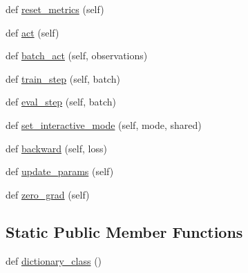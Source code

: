 \begin{DoxyCompactItemize}
def \hyperlink{classparlai_1_1core_1_1torch__agent_1_1TorchAgent_a03e18955cfd44dd019d0847bc7a46893}{reset\+\_\+metrics} (self)
\item 
def \hyperlink{classparlai_1_1core_1_1torch__agent_1_1TorchAgent_a51174dfa508970e3392246b02d0d94b5}{act} (self)
\item 
def \hyperlink{classparlai_1_1core_1_1torch__agent_1_1TorchAgent_a7754a74d6c87590f46e71ec486c285a8}{batch\+\_\+act} (self, observations)
\item 
def \hyperlink{classparlai_1_1core_1_1torch__agent_1_1TorchAgent_a8ba9d535736c0af100d00c5e7b02b61b}{train\+\_\+step} (self, batch)
\item 
def \hyperlink{classparlai_1_1core_1_1torch__agent_1_1TorchAgent_a18de0a52aeec4ef721aedbdd6ac06cad}{eval\+\_\+step} (self, batch)
\item 
def \hyperlink{classparlai_1_1core_1_1torch__agent_1_1TorchAgent_a6a7aff29231816a0f3cade9c72409dfc}{set\+\_\+interactive\+\_\+mode} (self, mode, shared)
\item 
def \hyperlink{classparlai_1_1core_1_1torch__agent_1_1TorchAgent_a8df662b1258ec67752b4fc0ad45733f9}{backward} (self, loss)
\item 
def \hyperlink{classparlai_1_1core_1_1torch__agent_1_1TorchAgent_a7e2c9e180887397daa6229a0f9700b1c}{update\+\_\+params} (self)
\item 
def \hyperlink{classparlai_1_1core_1_1torch__agent_1_1TorchAgent_a91c163f3e2d39b380095b7083f673b6e}{zero\+\_\+grad} (self)
\end{DoxyCompactItemize}
\subsection*{Static Public Member Functions}
\begin{DoxyCompactItemize}
\item 
def \hyperlink{classparlai_1_1core_1_1torch__agent_1_1TorchAgent_aea8849fa69a3f5dbd3216c8b06f180ea}{dictionary\+\_\+class} ()
\end{DoxyCompactItemize}
